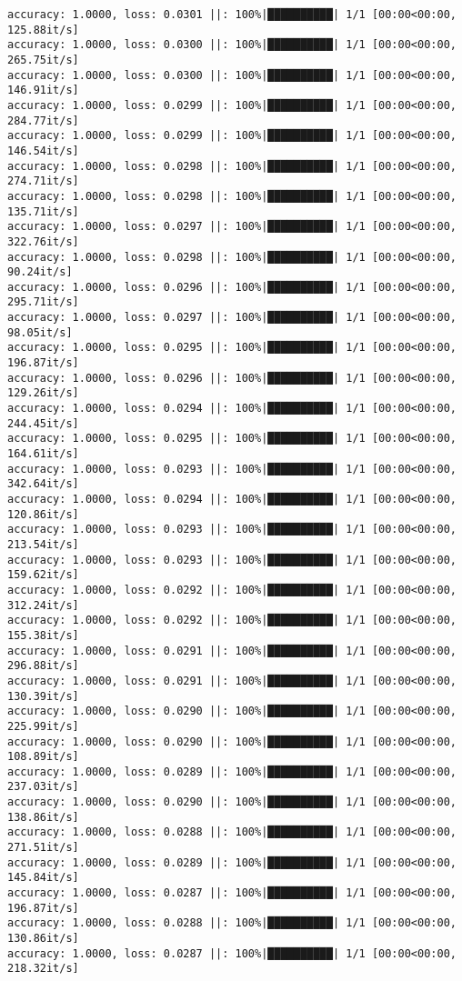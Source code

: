 \documentclass[
]{article}
\begin{document}
\begin{verbatim}
accuracy: 1.0000, loss: 0.0301 ||: 100%|██████████| 1/1 [00:00<00:00, 125.88it/s]
accuracy: 1.0000, loss: 0.0300 ||: 100%|██████████| 1/1 [00:00<00:00, 265.75it/s]
accuracy: 1.0000, loss: 0.0300 ||: 100%|██████████| 1/1 [00:00<00:00, 146.91it/s]
accuracy: 1.0000, loss: 0.0299 ||: 100%|██████████| 1/1 [00:00<00:00, 284.77it/s]
accuracy: 1.0000, loss: 0.0299 ||: 100%|██████████| 1/1 [00:00<00:00, 146.54it/s]
accuracy: 1.0000, loss: 0.0298 ||: 100%|██████████| 1/1 [00:00<00:00, 274.71it/s]
accuracy: 1.0000, loss: 0.0298 ||: 100%|██████████| 1/1 [00:00<00:00, 135.71it/s]
accuracy: 1.0000, loss: 0.0297 ||: 100%|██████████| 1/1 [00:00<00:00, 322.76it/s]
accuracy: 1.0000, loss: 0.0298 ||: 100%|██████████| 1/1 [00:00<00:00, 90.24it/s]
accuracy: 1.0000, loss: 0.0296 ||: 100%|██████████| 1/1 [00:00<00:00, 295.71it/s]
accuracy: 1.0000, loss: 0.0297 ||: 100%|██████████| 1/1 [00:00<00:00, 98.05it/s]
accuracy: 1.0000, loss: 0.0295 ||: 100%|██████████| 1/1 [00:00<00:00, 196.87it/s]
accuracy: 1.0000, loss: 0.0296 ||: 100%|██████████| 1/1 [00:00<00:00, 129.26it/s]
accuracy: 1.0000, loss: 0.0294 ||: 100%|██████████| 1/1 [00:00<00:00, 244.45it/s]
accuracy: 1.0000, loss: 0.0295 ||: 100%|██████████| 1/1 [00:00<00:00, 164.61it/s]
accuracy: 1.0000, loss: 0.0293 ||: 100%|██████████| 1/1 [00:00<00:00, 342.64it/s]
accuracy: 1.0000, loss: 0.0294 ||: 100%|██████████| 1/1 [00:00<00:00, 120.86it/s]
accuracy: 1.0000, loss: 0.0293 ||: 100%|██████████| 1/1 [00:00<00:00, 213.54it/s]
accuracy: 1.0000, loss: 0.0293 ||: 100%|██████████| 1/1 [00:00<00:00, 159.62it/s]
accuracy: 1.0000, loss: 0.0292 ||: 100%|██████████| 1/1 [00:00<00:00, 312.24it/s]
accuracy: 1.0000, loss: 0.0292 ||: 100%|██████████| 1/1 [00:00<00:00, 155.38it/s]
accuracy: 1.0000, loss: 0.0291 ||: 100%|██████████| 1/1 [00:00<00:00, 296.88it/s]
accuracy: 1.0000, loss: 0.0291 ||: 100%|██████████| 1/1 [00:00<00:00, 130.39it/s]
accuracy: 1.0000, loss: 0.0290 ||: 100%|██████████| 1/1 [00:00<00:00, 225.99it/s]
accuracy: 1.0000, loss: 0.0290 ||: 100%|██████████| 1/1 [00:00<00:00, 108.89it/s]
accuracy: 1.0000, loss: 0.0289 ||: 100%|██████████| 1/1 [00:00<00:00, 237.03it/s]
accuracy: 1.0000, loss: 0.0290 ||: 100%|██████████| 1/1 [00:00<00:00, 138.86it/s]
accuracy: 1.0000, loss: 0.0288 ||: 100%|██████████| 1/1 [00:00<00:00, 271.51it/s]
accuracy: 1.0000, loss: 0.0289 ||: 100%|██████████| 1/1 [00:00<00:00, 145.84it/s]
accuracy: 1.0000, loss: 0.0287 ||: 100%|██████████| 1/1 [00:00<00:00, 196.87it/s]
accuracy: 1.0000, loss: 0.0288 ||: 100%|██████████| 1/1 [00:00<00:00, 130.86it/s]
accuracy: 1.0000, loss: 0.0287 ||: 100%|██████████| 1/1 [00:00<00:00, 218.32it/s]

\end{verbatim}
\end{document}

